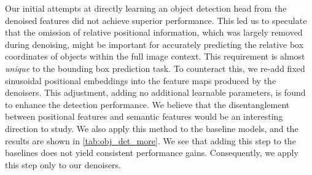 Our initial attempts at directly learning an object detection head from the denoised features did not achieve superior performance. This led us to speculate that the omission of relative positional information, which was largely removed during denoising, might be important for accurately predicting the relative box coordinates of objects within the full image context. This requirement is almost \textit{unique} to the bounding box prediction task. To counteract this, we re-add fixed sinusoidal positional embeddings into the feature maps produced by the denoisers. This adjustment, adding no additional learnable parameters, is found to enhance the detection performance. We believe that the disentanglement between positional features and semantic features would be an interesting direction to study. We also apply this method to the baseline models, and the results are shown in \cref{tab:obj_det_more}. We see that adding this step to the baselines does not yield consistent performance gains. Consequently, we apply this step only to our denoisers.


